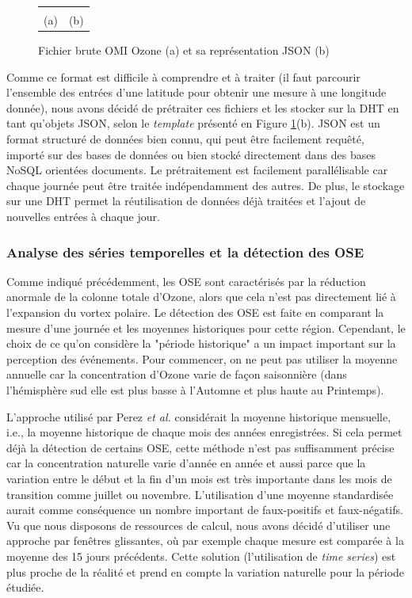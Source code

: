 \begin{figure}
	\centering
	\begin{tabular}{cc}
		\imagetop{\TOMS}&\imagetop{\JSON}\\
		{\small (a)}&{\small (b)}
	\end{tabular}
	\caption{Fichier brute OMI Ozone (a) et sa représentation JSON (b)}\label{fig:toms}
	
\end{figure}

Comme ce format est difficile à comprendre et à traiter (il faut parcourir l'ensemble des entrées d'une latitude pour obtenir une mesure à une longitude donnée), nous avons décidé de prétraiter ces fichiers et les stocker sur la DHT en tant qu’objets JSON, selon le \textit{template} présenté en Figure \ref{fig:toms}(b). JSON est un format structuré de données bien connu, qui peut être facilement requêté, importé sur des bases de données ou bien stocké directement dans des bases NoSQL orientées  documents. Le prétraitement est facilement parallélisable car chaque journée peut être traitée indépendamment des autres. De plus, le stockage sur une DHT permet la réutilisation de données déjà traitées et l'ajout de nouvelles entrées à chaque jour. 

\subsubsection*{Analyse des séries temporelles et la détection des OSE\label{sec:timeseries}}

Comme indiqué précédemment, les OSE sont caractérisés par la réduction anormale de la colonne totale d'Ozone, alors que cela n'est pas directement lié à l'expansion du vortex polaire. Le détection des OSE est faite en comparant la mesure d'une journée et les moyennes historiques pour cette région. Cependant, le choix de ce qu'on considère la "période historique" a un impact important sur la perception des événements. Pour commencer, on ne peut pas utiliser la moyenne annuelle car la concentration d'Ozone varie de façon saisonnière (dans l'hémisphère sud elle est plus basse à l'Automne et plus haute au Printemps). 

L'approche utilisé par Perez \textit{et al. }\cite{Peres2013} considérait la moyenne historique mensuelle, i.e., la moyenne historique de chaque mois des années enregistrées. Si cela permet déjà la détection de certains OSE, cette méthode n'est pas suffisamment précise car la concentration naturelle varie d'année en année et aussi parce que la variation entre le début et la fin d'un mois est très importante dans les mois de transition comme juillet ou novembre. L'utilisation d'une moyenne standardisée aurait comme conséquence un nombre important de faux-positifs et faux-négatifs. Vu que nous disposons de ressources de calcul, nous avons décidé d'utiliser une approche par fenêtres glissantes, où par exemple chaque mesure est comparée à la moyenne des 15 jours précédents. Cette solution (l'utilisation de \textit{time series}) est plus proche de la réalité et prend en compte la variation naturelle pour la période étudiée.

